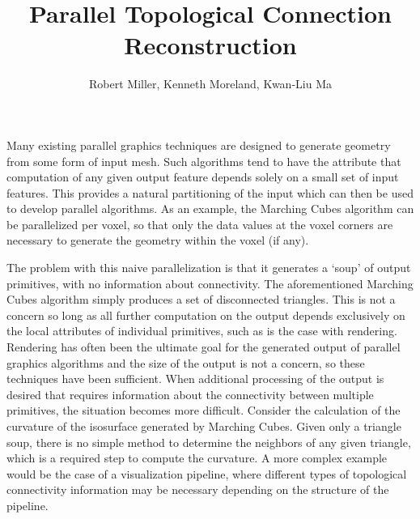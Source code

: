 \documentclass[journal]{vgtc}                %
\title{Parallel Topological Connection Reconstruction}
\author{Robert Miller, Kenneth Moreland, Kwan-Liu Ma}
\begin{document}


\maketitle

Many existing parallel graphics techniques are designed to generate geometry from
some form of input mesh. Such algorithms tend to have the attribute that
computation of any given output feature depends solely on a small set
of input features. This provides a natural partitioning of the input
which can then be used to develop parallel algorithms. As an example,
the Marching Cubes \cite{Lorensen1987} algorithm can be parallelized per voxel, so that only
the data values at the voxel corners are necessary to generate the geometry
within the voxel (if any).

The problem with this naive parallelization is that it generates a
`soup' of output primitives, with no information about connectivity.
The aforementioned Marching Cubes algorithm simply produces a set of disconnected triangles.
This is not a concern so long as all further computation on the output
depends exclusively on the local attributes of individual primitives, such as is
the case with rendering. Rendering has often been the ultimate goal for the
generated output of parallel graphics algorithms and the size of the output is not a concern, so these techniques have been sufficient. When
additional processing of the output is desired that requires information about the connectivity 
between multiple primitives, the situation becomes more difficult. Consider the calculation of 
the curvature of the isosurface generated by Marching Cubes.
Given only a triangle soup, there is no simple method to determine the neighbors of any given triangle, which is a required step to 
compute the curvature. A more complex example would be the case of a visualization pipeline,
where different types of topological connectivity information may be necessary depending
on the structure of the pipeline.
\end{document}
